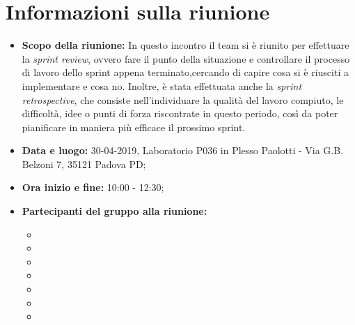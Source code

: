 \clearpage
\section{Informazioni sulla riunione}
\begin{itemize}
	\item \textbf {Scopo della riunione:} In questo incontro il team si è riunito per effettuare la \textit{sprint review}, ovvero fare il punto della situazione e controllare il processo di lavoro dello sprint appena terminato,cercando di capire cosa si è riusciti a implementare e cosa no. Inoltre, è stata effettuata anche la \textit{sprint retrospective}, che consiste nell'individuare la qualità del lavoro compiuto, le difficoltà, idee o punti di forza riscontrate in questo periodo, così da poter pianificare in maniera più efficace il prossimo sprint.
	\item \textbf {Data e luogo:} 30-04-2019, Laboratorio P036 in Plesso Paolotti - Via G.B. Belzoni 7, 35121 Padova PD;
	\item \textbf {Ora inizio e fine:} 10:00 - 12:30;
	\item \textbf {Partecipanti del gruppo alla riunione:} 
		 \begin{itemize}
			\item \sonia
			\item \pardeep
			\item \luca
			\item \matteo
			\item \alberto
			\item \alessandro
			\item \andrea
		\end{itemize}
\end{itemize}